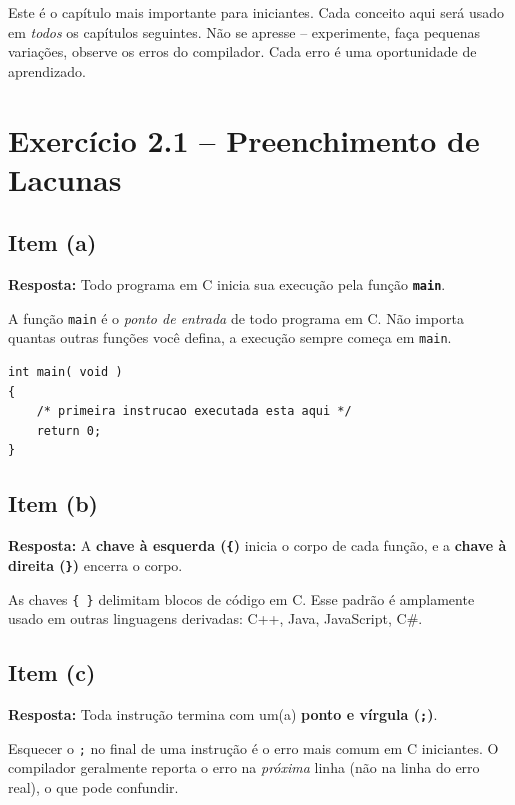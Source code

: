 \documentclass[12pt,a4paper]{article}
\begin{document}
\begin{boaprática}
  Este é o capítulo mais importante para iniciantes. Cada conceito aqui será
  usado em \textit{todos} os capítulos seguintes. Não se apresse -- experimente,
  faça pequenas variações, observe os erros do compilador. Cada erro é uma
  oportunidade de aprendizado.
\end{boaprática}

\tableofcontents\newpage

\section{Exercício 2.1 -- Preenchimento de Lacunas}

\subsection*{Item (a)}
\begin{respostabox}
\textbf{Resposta:} Todo programa em C inicia sua execução pela função
\textcolor{deitelblue}{\textbf{\texttt{main}}}.

A função \texttt{main} é o \textit{ponto de entrada} de todo programa em C. Não
importa quantas outras funções você defina, a execução sempre começa em \texttt{main}.

\begin{lstlisting}
int main( void )
{
    /* primeira instrucao executada esta aqui */
    return 0;
}
\end{lstlisting}
\end{respostabox}

\subsection*{Item (b)}
\begin{respostabox}
\textbf{Resposta:} A \textcolor{deitelblue}{\textbf{chave à esquerda (\texttt{\{})}}
inicia o corpo de cada função, e a
\textcolor{deitelblue}{\textbf{chave à direita (\texttt{\}})}} encerra o corpo.

As chaves \texttt{\{ \}} delimitam blocos de código em C. Esse padrão é
amplamente usado em outras linguagens derivadas: C++, Java, JavaScript, C\#.
\end{respostabox}

\subsection*{Item (c)}
\begin{respostabox}
\textbf{Resposta:} Toda instrução termina com um(a)
\textcolor{deitelblue}{\textbf{ponto e vírgula (\texttt{;})}}.

\begin{erroco}
  Esquecer o \texttt{;} no final de uma instrução é o erro mais comum em C
  iniciantes. O compilador geralmente reporta o erro na \textit{próxima} linha
  (não na linha do erro real), o que pode confundir.
\end{erroco}
\end{respostabox}
\end{document}
